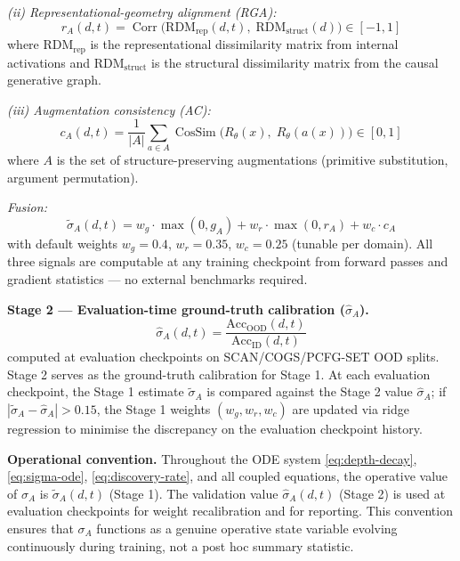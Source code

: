 \documentclass[11pt,a4paper]{article}
\DeclareMathOperator{\Corr}{Corr}
\DeclareMathOperator{\CosSim}{CosSim}
\begin{document}
\textit{(ii) Representational-geometry alignment (RGA):}
\begin{equation}\label{eq:rga}
r_A(d,t) = \Corr\!\Big(\text{RDM}_{\text{rep}}(d,t),\;\text{RDM}_{\text{struct}}(d)\Big) \in [-1,1]
\end{equation}
where $\text{RDM}_{\text{rep}}$ is the representational dissimilarity matrix
from internal activations and $\text{RDM}_{\text{struct}}$ is the structural
dissimilarity matrix from the causal generative graph.

\textit{(iii) Augmentation consistency (AC):}
\begin{equation}\label{eq:ac}
c_A(d,t) = \frac{1}{|A|}\sum_{a \in A} \CosSim\!\Big(R_{\theta}(x),\;R_{\theta}(a(x))\Big) \in [0,1]
\end{equation}
where $A$ is the set of structure-preserving augmentations (primitive
substitution, argument permutation).

\textit{Fusion:}
\begin{equation}\label{eq:fusion}
\tilde{\sigma}_A(d,t) = w_g \cdot \max(0, g_A) + w_r \cdot \max(0, r_A) + w_c \cdot c_A
\end{equation}
with default weights $w_g = 0.4$, $w_r = 0.35$, $w_c = 0.25$ (tunable per
domain). All three signals are computable at any training checkpoint from
forward passes and gradient statistics --- no external benchmarks required.

\textbf{Stage 2 --- Evaluation-time ground-truth calibration ($\hat{\sigma}_A$).}
\begin{equation}
\hat{\sigma}_A(d,t) = \frac{\text{Acc}_{\text{OOD}}(d,t)}{\text{Acc}_{\text{ID}}(d,t)}
\label{eq:sgg-proxy}
\end{equation}
computed at evaluation checkpoints on SCAN/COGS/PCFG-SET OOD splits.
Stage 2 serves as the ground-truth calibration for Stage 1. At each
evaluation checkpoint, the Stage 1 estimate $\tilde{\sigma}_A$ is compared
against the Stage 2 value $\hat{\sigma}_A$; if
$|\tilde{\sigma}_A - \hat{\sigma}_A| > 0.15$, the Stage 1 weights
$(w_g, w_r, w_c)$ are updated via ridge regression to minimise the
discrepancy on the evaluation checkpoint history.

\textbf{Operational convention.} Throughout the ODE system
\eqref{eq:depth-decay}, \eqref{eq:sigma-ode},
\eqref{eq:discovery-rate}, and all coupled equations, the operative
value of $\sigma_A$ is $\tilde{\sigma}_A(d,t)$ (Stage 1). The validation
value $\hat{\sigma}_A(d,t)$ (Stage 2) is used at evaluation checkpoints
for weight recalibration and for reporting. This convention ensures that
$\sigma_A$ functions as a genuine operative state variable evolving
continuously during training, not a post hoc summary statistic.
\end{document}
